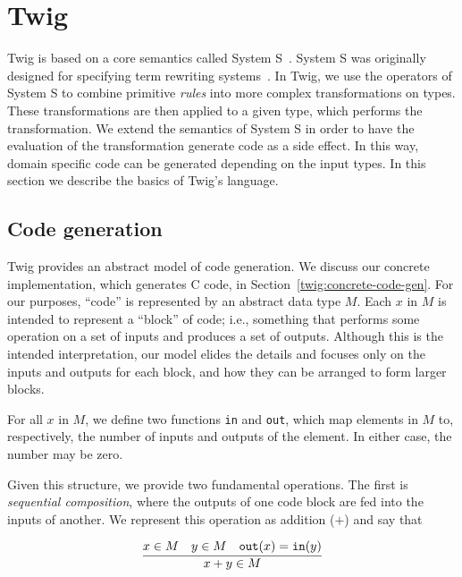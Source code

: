
\section{Twig}


Twig is based on a core semantics called System S~\cite{Visser:1998p333}.
System S was originally designed for specifying term rewriting
systems~\cite{baader98rewriting}. In Twig, we use the operators of System S to
combine primitive \emph{rules} into more complex transformations on types.
These transformations are then applied to a given type, which performs the
transformation. We extend the semantics of System S in order to have the
evaluation of the transformation generate code as a side effect. In this way,
domain specific code can be generated depending on the input types. In this
section we describe the basics of Twig's language.


\subsection{Code generation}
\label{twig:code-gen}

Twig provides an abstract model of code generation. We discuss our concrete
implementation, which generates C code, in
Section~\ref{twig:concrete-code-gen}. For our purposes, ``code'' is
represented by an abstract data type $M$. Each $x$ in $M$ is intended to
represent a ``block'' of code; i.e., something that performs some operation on
a set of inputs and produces a set of outputs. Although this is the intended
interpretation, our model elides the details and focuses only on the inputs
and outputs for each block, and how they can be arranged to form larger
blocks.

For all $x$ in $M$, we define two functions \texttt{in} and \texttt{out},
which map elements in $M$ to, respectively, the number of inputs and outputs
of the element. In either case, the number may be zero.

Given this structure, we provide two fundamental operations. The first is
\emph{sequential composition}, where the outputs of one code block are fed
into the inputs of another. We represent this operation as addition ($+$) and
say that

\[
\infer
{x+y \in M}
{x \in M \quad y \in M \quad \mathtt{out}(x) = \mathtt{in}(y)}
\]

